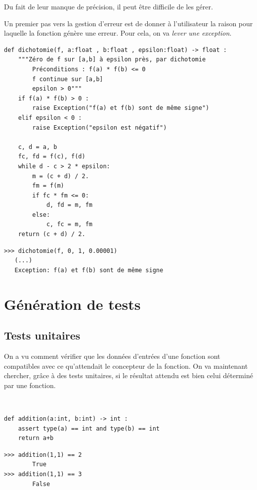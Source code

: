 Du fait de leur manque de précision, il peut être difficile de les gérer. 

Un premier pas vers la gestion d'erreur est de donner à l'utilisateur la raison pour laquelle la fonction génère une erreur. 
Pour cela, on va \textit{lever une exception}.

\begin{lstlisting}
def dichotomie(f, a:float , b:float , epsilon:float) -> float :
    """Zéro de f sur [a,b] à epsilon près, par dichotomie
        Préconditions : f(a) * f(b) <= 0
        f continue sur [a,b]
        epsilon > 0"""
    if f(a) * f(b) > 0 : 
        raise Exception("f(a) et f(b) sont de même signe")
    elif epsilon < 0 :
        raise Exception("epsilon est négatif")

    c, d = a, b
    fc, fd = f(c), f(d)
    while d - c > 2 * epsilon:
        m = (c + d) / 2.
        fm = f(m)
        if fc * fm <= 0:
            d, fd = m, fm
        else:
            c, fc = m, fm
    return (c + d) / 2.
\end{lstlisting}

\begin{lstlisting}
>>> dichotomie(f, 0, 1, 0.00001)
   (...)
   Exception: f(a) et f(b) sont de même signe
\end{lstlisting}

\section{Génération de tests}

\subsection{Tests unitaires}

On a vu comment vérifier que les données d'entrées d'une fonction sont compatibles avec ce qu'attendait le concepteur de la fonction. On va maintenant chercher, grâce à des tests unitaires, si le résultat attendu est bien celui déterminé par une fonction. 
\begin{exemple}~\\
\begin{minipage}[c]{.5\linewidth}
\begin{lstlisting}
def addition(a:int, b:int) -> int : 
    assert type(a) == int and type(b) == int
    return a+b
\end{lstlisting}
\end{minipage} \hfill
\begin{minipage}[c]{.45\linewidth}
\begin{lstlisting}
>>> addition(1,1) == 2
        True
>>> addition(1,1) == 3
        False
\end{lstlisting}
\end{minipage} 

\end{exemple}

